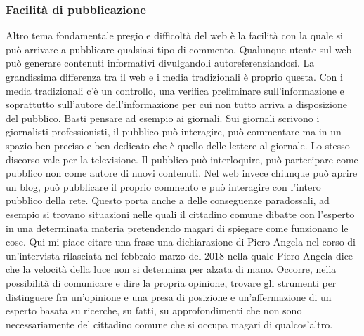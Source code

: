 \subsubsection{Facilità di pubblicazione}
Altro tema fondamentale pregio e difficoltà del web è la facilità con la quale si può arrivare a pubblicare qualsiasi tipo di commento. Qualunque utente sul web può generare contenuti informativi divulgandoli autoreferenziandosi. 
La grandissima differenza tra il web e i media tradizionali è proprio questa. Con i media tradizionali c'è un controllo, una verifica preliminare sull'informazione e soprattutto sull'autore dell'informazione per cui non tutto arriva a disposizione del pubblico. Basti pensare ad esempio ai giornali. Sui giornali scrivono i giornalisti professionisti, il pubblico può interagire, può commentare ma in un spazio ben preciso e ben dedicato che è quello delle lettere al giornale. 
Lo stesso discorso vale per la televisione. Il pubblico può interloquire, può partecipare come pubblico non come autore di nuovi contenuti. 
Nel web invece chiunque può aprire un blog, può pubblicare il proprio commento e può interagire con l'intero pubblico della rete.
Questo porta anche a delle conseguenze paradossali, ad esempio si trovano situazioni nelle quali il cittadino comune dibatte con l'esperto in una determinata materia pretendendo magari di spiegare come funzionano le cose. Qui mi piace citare una frase una dichiarazione di Piero Angela nel corso di un'intervista rilasciata nel febbraio-marzo del 2018 nella quale Piero Angela dice che la velocità della luce non si determina per alzata di mano. 
Occorre, nella possibilità di comunicare e dire la propria opinione,  trovare gli strumenti per distinguere fra un'opinione e una presa di posizione e un'affermazione di un esperto basata su ricerche, su fatti, su approfondimenti che non sono necessariamente del cittadino comune che si occupa magari di qualcos'altro. 

